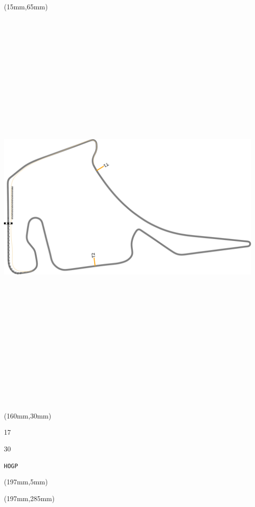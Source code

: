 \begin{textblock*}{185mm}(15mm,65mm)%
\centering
\mbox{\includegraphics[width=185mm,height=210mm,keepaspectratio]{PT/HOGP.pdf}}
\end{textblock*}
\begin{textblock*}{40mm}(160mm,30mm)%
\Large
\par{} 
\par17 
\par30 
\par\hfill\tiny\tt HOGP\\
\end{textblock*}
\begin{textblock*}{20mm}(197mm,5mm)%
\fbox{\thepage}
\label{HOGP}
\end{textblock*}
\begin{textblock*}{20mm}(197mm,285mm)%
\fbox{\thepage}
\end{textblock*}


